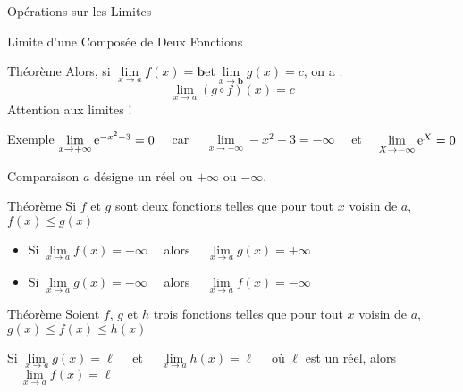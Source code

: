 \documentclass{cours}
\begin{document}
\begin{Gpartie}{Opérations sur les Limites}
\begin{Spartie}{Limite d'une Composée de Deux Fonctions}
\begin{SSpartie}{Théorème}
                Alors, si $\lim\limits_{x\to a}f(x)=\boldsymbol{b}$\quad et\quad$\lim\limits_{x\to\boldsymbol{b}}g(x)=c$, on a : \[\lim\limits_{x\to a}(g\circ f)(x)=c\]
                Attention aux limites !
            \end{SSpartie}
            \begin{SSpartie}{Exemple} 
                $\lim\limits_{x\to+\infty}\mathrm{e}^{-x^2-3}=0\quad$ car $\quad\lim\limits_{x\to+\infty}-x^2-3=-\infty\quad$ et $\quad\lim\limits_{X\to-\infty}\mathrm{e}^X=0$
            \end{SSpartie}
        \end{Spartie}
        \begin{Spartie}{Comparaison} 
            $a$ désigne un réel ou $+\infty$ ou $-\infty$.
            \begin{SSpartie}{Théorème} 
                Si $f$ et $g$ sont deux fonctions telles que pour tout $x$ voisin de $a$, $f(x)\leq g(x)$
                \begin{itemize}
                    \item Si $\lim\limits_{x\to a}f(x)=+\infty\quad$ alors $\quad\lim\limits_{x\to a}g(x)=+\infty$
                    \item Si $\lim\limits_{x\to a}g(x)=-\infty\quad$ alors $\quad\lim\limits_{x\to a}f(x)=-\infty$
                \end{itemize}
            \end{SSpartie}
            \begin{SSpartie}{Théorème} 
                Soient $f$, $g$ et $h$ trois fonctions telles que pour tout $x$ voisin de $a$, $g(x)\leq f(x)\leq h(x)$

                Si $\lim\limits_{x\to a}g(x)=\ell\quad$ et $\quad\lim\limits_{x\to a}h(x)=\ell\quad$ où $\ell$ est un réel, alors $\quad\lim\limits_{x\to a}f(x)=\ell$
            \end{SSpartie}
        \end{Spartie}
    \end{Gpartie}
\end{document}
